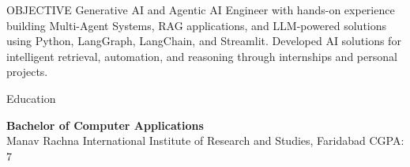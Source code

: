 \documentclass{resume}
\begin{document}
\begin{rSection}{OBJECTIVE}
Generative AI and Agentic AI Engineer with hands-on experience building Multi-Agent Systems, RAG applications, and LLM-powered solutions using Python, LangGraph, LangChain, and Streamlit. Developed AI solutions for intelligent retrieval, automation, and reasoning through internships and personal projects.

\end{rSection}

\begin{rSection}{Education}

{\bf Bachelor of Computer Applications}\\
Manav Rachna International Institute of Research and Studies, Faridabad \hfill {CGPA: 7}

\end{rSection}
\end{document}
